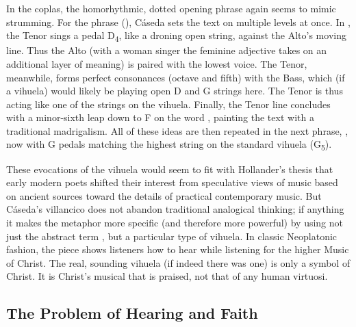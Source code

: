 

In the coplas, the homorhythmic, dotted opening phrase again seems to mimic strumming.
For the phrase  (), Cáseda sets the text on multiple levels at once.
In , the Tenor sings a pedal D\textsubscript{4}, like a droning open string, against the Alto's moving line.
Thus the  Alto (with a woman singer the feminine adjective takes on an additional layer of meaning) is paired with the lowest voice.
The Tenor, meanwhile, forms perfect consonances (octave and fifth) with the Bass, which (if a vihuela) would likely be playing open D and G strings here. 
The Tenor is thus acting like one of the strings on the vihuela.
Finally, the Tenor line concludes with a minor-sixth leap down to F\sh{} on the word , painting the text with a traditional madrigalism.
All of these ideas are then repeated in the next phrase, , now with G pedals matching the highest string on the standard vihuela (G\textsubscript{5}).

These evocations of the vihuela would seem to fit with Hollander's thesis that early modern poets shifted their interest from speculative views of music based on ancient sources toward the details of practical contemporary music.
But Cáseda's villancico does not abandon traditional analogical thinking; if anything it makes the metaphor more specific (and therefore more powerful) by using not just the abstract term , but a particular type of vihuela. 
In classic Neoplatonic fashion, the piece shows listeners how to hear  while listening for the higher Music of Christ. 
The real, sounding vihuela (if indeed there was one) is only a symbol of Christ.
It is Christ's musical  that is praised, not that of any human virtuosi.

\subsection{The Problem of Hearing and Faith}

